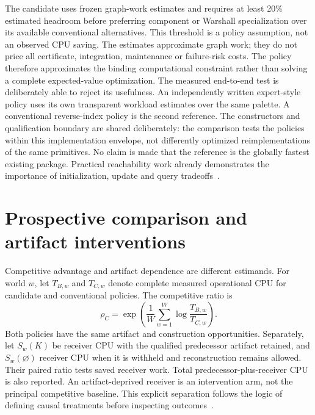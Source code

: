 The candidate uses frozen graph-work estimates and requires at least 20\% estimated headroom before preferring component or Warshall specialization over its available conventional alternatives. This threshold is a policy assumption, not an observed CPU saving. The estimates approximate graph work; they do not price all certificate, integration, maintenance or failure-risk costs. The policy therefore approximates the binding computational constraint rather than solving a complete expected-value optimization. The measured end-to-end test is deliberately able to reject its usefulness. An independently written expert-style policy uses its own transparent workload estimates over the same palette. A conventional reverse-index policy is the second reference. The constructors and qualification boundary are shared deliberately: the comparison tests the policies within this implementation envelope, not differently optimized reimplementations of the same primitives. No claim is made that the reference is the globally fastest existing package. Practical reachability work already demonstrates the importance of initialization, update and query tradeoffs~\cite{hanauer2020dynamic}.

\section{Prospective comparison and artifact interventions}
\label{sec:bloom-methods}

Competitive advantage and artifact dependence are different estimands. For world $w$, let $T_{B,w}$ and $T_{C,w}$ denote complete measured operational CPU for candidate and conventional policies. The competitive ratio is
\begin{equation}
 \rho_C=\exp\left(\frac{1}{W}\sum_{w=1}^{W}
 \log\frac{T_{B,w}}{T_{C,w}}\right).
\end{equation}
Both policies have the same artifact and construction opportunities. Separately, let $S_w(K)$ be receiver CPU with the qualified predecessor artifact retained, and $S_w(\varnothing)$ receiver CPU when it is withheld and reconstruction remains allowed. Their paired ratio tests saved receiver work. Total predecessor-plus-receiver CPU is also reported. An artifact-deprived receiver is an intervention arm, not the principal competitive baseline. This explicit separation follows the logic of defining causal treatments before inspecting outcomes~\cite{rubin2008design}.

